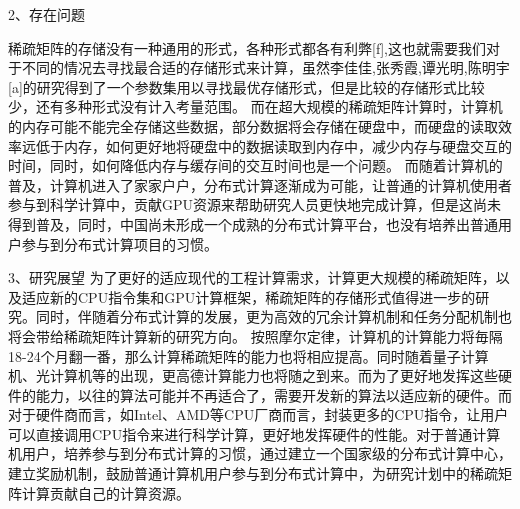 \documentclass{article}
\begin{document}
2、存在问题\newline

稀疏矩阵的存储没有一种通用的形式，各种形式都各有利弊[f],这也就需要我们对于不同的情况去寻找最合适的存储形式来计算，虽然李佳佳,张秀霞,谭光明,陈明宇[a]的研究得到了一个参数集用以寻找最优存储形式，但是比较的存储形式比较少，还有多种形式没有计入考量范围。
\newline
而在超大规模的稀疏矩阵计算时，计算机的内存可能不能完全存储这些数据，部分数据将会存储在硬盘中，而硬盘的读取效率远低于内存，如何更好地将硬盘中的数据读取到内存中，减少内存与硬盘交互的时间，同时，如何降低内存与缓存间的交互时间也是一个问题。
\newline
而随着计算机的普及，计算机进入了家家户户，分布式计算逐渐成为可能，让普通的计算机使用者参与到科学计算中，贡献GPU资源来帮助研究人员更快地完成计算，但是这尚未得到普及，同时，中国尚未形成一个成熟的分布式计算平台，也没有培养出普通用户参与到分布式计算项目的习惯。\newline



3、研究展望\newline
为了更好的适应现代的工程计算需求，计算更大规模的稀疏矩阵，以及适应新的CPU指令集和GPU计算框架，稀疏矩阵的存储形式值得进一步的研究。同时，伴随着分布式计算的发展，更为高效的冗余计算机制和任务分配机制也将会带给稀疏矩阵计算新的研究方向。
按照摩尔定律，计算机的计算能力将毎隔18-24个月翻一番，那么计算稀疏矩阵的能力也将相应提高。同时随着量子计算机、光计算机等的出现，更高德计算能力也将随之到来。而为了更好地发挥这些硬件的能力，以往的算法可能并不再适合了，需要开发新的算法以适应新的硬件。而对于硬件商而言，如Intel、AMD等CPU厂商而言，封装更多的CPU指令，让用户可以直接调用CPU指令来进行科学计算，更好地发挥硬件的性能。对于普通计算机用户，培养参与到分布式计算的习惯，通过建立一个国家级的分布式计算中心，建立奖励机制，鼓励普通计算机用户参与到分布式计算中，为研究计划中的稀疏矩阵计算贡献自己的计算资源。\newline
\end{document}
